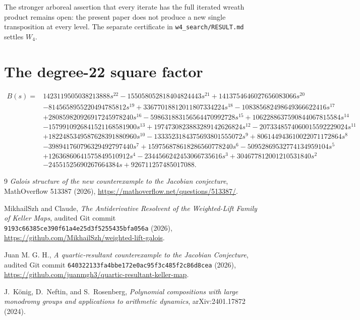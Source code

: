 \documentclass[11pt]{article}
\begin{document}
The stronger arboreal assertion that every iterate has the full iterated
wreath product remains open: the present paper does not produce a new single
transposition at every level. The separate certificate in
\texttt{w4\_search/\allowbreak RESULT.md} settles $W_4$.

\appendix
\section{The degree-22 square factor}\label{app:B}
\begingroup\scriptsize
\begin{align*}
B(s)={}&1423119505038213888s^{22}-155058052818404824443s^{21}
+1413754646027656083066s^{20}\\
&-8145658955220494785812s^{19}+33677018812011807334224s^{18}
-108385682498649366622416s^{17}\\
&+280859820926917245978240s^{16}-598631883156564470992728s^{15}
+1062288637590844067815584s^{14}\\
&-1579910926841521168581900s^{13}+1974730823883289142626824s^{12}
-2073348574060015592229024s^{11}\\
&+1822485349587628391880960s^{10}-1333523184375693801555072s^9
+806144943610022071172864s^8\\
&-398941760796329492797440s^7+159756878618286560778240s^6
-50952869532774134959104s^5\\
&+12636860641575849510912s^4-2344566242453066735616s^3
+304677812001210531840s^2\\
&-24551525690267664384s+926711257485017088.
\end{align*}
\endgroup

\begin{thebibliography}{9}
\emph{Galois structure of the new counterexample to the Jacobian conjecture},
MathOverflow 513387 (2026),
\url{https://mathoverflow.net/questions/513387/}.

MikhailSzh and Claude,
\emph{The Antiderivative Resolvent of the Weighted-Lift Family of Keller Maps},
audited Git commit \texttt{9193c66385ce390f61a4e25d3f5255435bfa056a} (2026),
\url{https://github.com/MikhailSzh/weighted-lift-galois}.

Juan M. G. H.,
\emph{A quartic-resultant counterexample to the Jacobian Conjecture},
audited Git commit \texttt{640322133fa4bbe172e0ac95f3c485f2c86d8cea} (2026),
\url{https://github.com/juanmgh3/quartic-resultant-keller-map}.

J.~K\"onig, D.~Neftin, and S.~Rosenberg,
\emph{Polynomial compositions with large monodromy groups and applications to
arithmetic dynamics}, arXiv:2401.17872 (2024).
\end{thebibliography}
\end{document}
